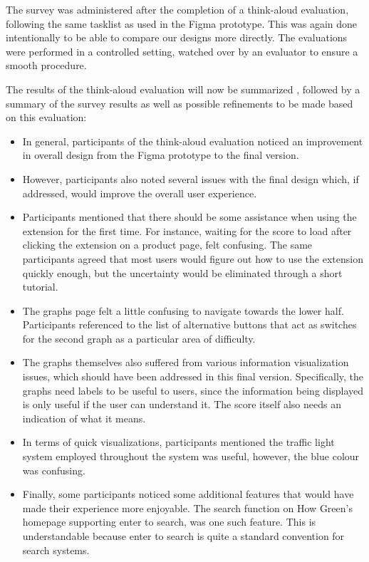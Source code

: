 \documentclass[a4,10pt,twocolumn]{article}
\begin{document}
The survey was administered after the completion of a think-aloud evaluation, following the same tasklist as used in the Figma prototype. This was again done intentionally to be able to compare our designs more directly. The evaluations were performed in a controlled setting, watched over by an evaluator to ensure a smooth procedure.

The results of the think-aloud evaluation will now be summarized , followed by a summary of the survey results as well as possible refinements to be made based on this evaluation:

\begin{itemize}
    \item In general, participants of the think-aloud evaluation noticed an improvement in overall design from the Figma prototype to the final version.
    \item However, participants also noted several issues with the final design which, if addressed, would improve the overall user experience.
    \item Participants mentioned that there should be some assistance when using the extension for the first time. For instance, waiting for the score to load after clicking the extension on a product page, felt confusing. The same participants agreed that most users would figure out how to use the extension quickly enough, but the uncertainty would be eliminated through a short tutorial. 
    \item The graphs page felt a little confusing to navigate towards the lower half. Participants referenced to the list of alternative buttons that act as switches for the second graph as a particular area of difficulty. 
    \item The graphs themselves also suffered from various information visualization issues, which should have been addressed in this final version. Specifically, the graphs need labels to be useful to users, since the information being displayed is only useful if the user can understand it. The score itself also needs an indication of what it means.
    \item In terms of quick visualizations, participants mentioned the traffic light system employed throughout the system was useful, however, the blue colour was confusing. 
    \item Finally, some participants noticed some additional features that would have made their experience more enjoyable. The search function on How Green's homepage supporting enter to search, was one such feature. This is understandable because enter to search is quite a standard convention for search systems.
\end{itemize}
\end{document}
